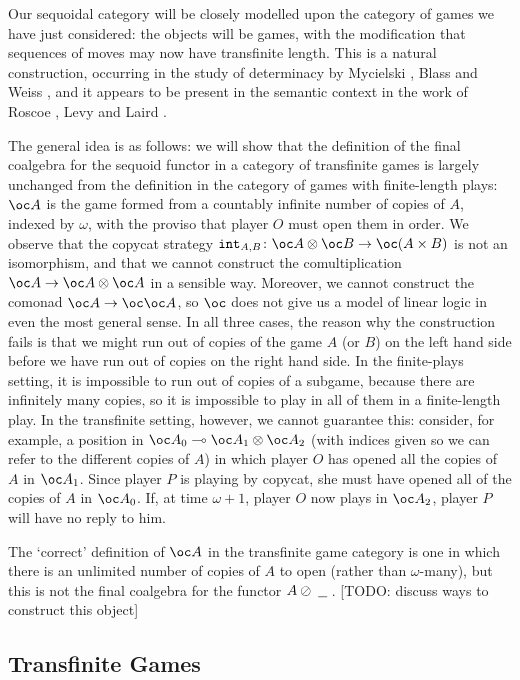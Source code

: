 \documentclass[a4paper,UKenglish]{lipics-v2016}
\theoremstyle{plain}
\theoremstyle{definition}
\newcommand*\from{\colon}
\newcommand{\tensor}{\otimes}
\newcommand{\sequoid}{\oslash}
\renewcommand{\implies}{\multimap}
\newcommand{\blank}{\;\underline{\hspace{1.5ex}}\;}
\renewcommand{\int}{{\mathtt{int}}}
\begin{document}
Our sequoidal category will be closely modelled upon the category of games we have just considered: the objects will be games, with the modification that sequences of moves may now have transfinite length.  This is a natural construction, occurring in the study of determinacy by Mycielski \cite{mycielskiChoice}, Blass \cite{blassChoice} and Weiss \cite{longgamesbook}, and it appears to be present in the semantic context in the work of Roscoe \cite{RoscoeCspInfinite}, Levy \cite{LevyGsInfinite} and Laird \cite{LairdOrdinalGames}.  

The general idea is as follows: we will show that the definition of the final coalgebra for the sequoid functor in a category of transfinite games is largely unchanged from the definition in the category of games with finite-length plays: $\oc A$ is the game formed from a countably infinite number of copies of $A$, indexed by $\omega$, with the proviso that player $O$ must open them in order.  We observe that the copycat strategy $\int_{A,B}\from\oc A\tensor\oc B\to \oc(A\times B)$ is not an isomorphism, and that we cannot construct the comultiplication $\oc A \to \oc A \tensor \oc A$ in a sensible way.  Moreover, we cannot construct the comonad $\oc A \to \oc \oc A$, so $\oc$ does not give us a model of linear logic in even the most general sense.  In all three cases, the reason why the construction fails is that we might run out of copies of the game $A$ (or $B$) on the left hand side before we have run out of copies on the right hand side.  In the finite-plays setting, it is impossible to run out of copies of a subgame, because there are infinitely many copies, so it is impossible to play in all of them in a finite-length play.  In the transfinite setting, however, we cannot guarantee this: consider, for example, a position in $\oc A_0 \implies \oc A_1 \tensor \oc A_2$ (with indices given so we can refer to the different copies of $A$) in which player $O$ has opened all the copies of $A$ in $\oc A_1$.  Since player $P$ is playing by copycat, she must have opened all of the copies of $A$ in $\oc A_0$.  If, at time $\omega+1$, player $O$ now plays in $\oc A_2$, player $P$ will have no reply to him.

The `correct' definition of $\oc A$ in the transfinite game category is one in which there is an unlimited number of copies of $A$ to open (rather than $\omega$-many), but this is not the final coalgebra for the functor $A\sequoid\blank$.  [TODO: discuss ways to construct this object]

\subsection{Transfinite Games}
\end{document}

